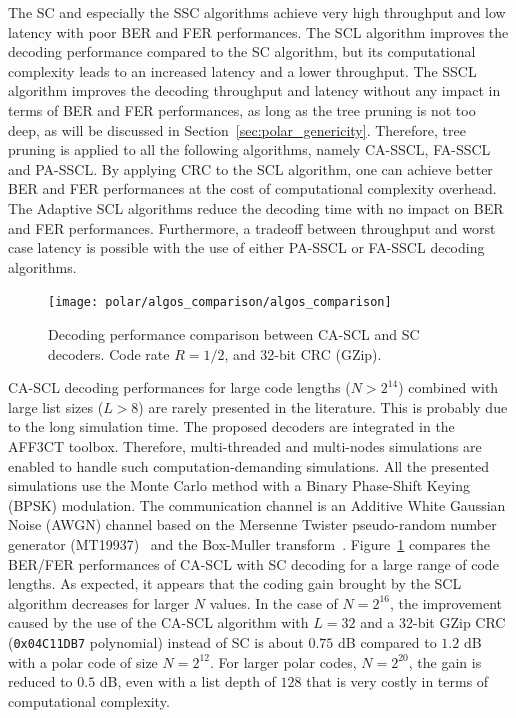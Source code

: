 The SC and especially the SSC algorithms achieve very high throughput and low
latency with poor BER and FER performances. The SCL algorithm improves the
decoding performance compared to the SC algorithm, but its computational
complexity leads to an increased latency and a lower throughput. The SSCL
algorithm improves the decoding throughput and latency without any impact in
terms of BER and FER performances, as long as the tree pruning is not too deep,
as will be discussed in Section~\ref{sec:polar_genericity}. Therefore, tree
pruning is applied to all the following algorithms, namely CA-SSCL, FA-SSCL and
PA-SSCL. By applying CRC to the SCL algorithm, one can achieve better BER and
FER performances at the cost of computational complexity overhead. The Adaptive
SCL algorithms reduce the decoding time with no impact on BER and FER
performances. Furthermore, a tradeoff between throughput and worst case latency
is possible with the use of either PA-SSCL or FA-SSCL decoding algorithms.

\begin{figure}
  \centering
  \texttt{[image: polar/algos\_comparison/algos\_comparison]}
  \caption{Decoding performance comparison between CA-SCL and SC decoders.
    Code rate $R = 1/2$, and 32-bit CRC (GZip).}
  \label{plot:polar_algos_comparison}
\end{figure}

CA-SCL decoding performances for large code lengths ($N > 2^{14}$) combined with
large list sizes ($L > 8$) are rarely presented in the literature. This is
probably due to the long simulation time. The proposed decoders are integrated
in the AFF3CT toolbox. Therefore, multi-threaded and multi-nodes simulations
are enabled to handle such computation-demanding simulations. All the presented
simulations use the Monte Carlo method with a Binary Phase-Shift Keying (BPSK)
modulation. The communication channel is an Additive White Gaussian Noise (AWGN)
channel based on the Mersenne Twister pseudo-random number generator
(MT19937)~\cite{Matsumoto1998} and the Box-Muller transform~\cite{Box1958}.
Figure~\ref{plot:polar_algos_comparison} compares the BER/FER performances of
CA-SCL with SC decoding for a large range of code lengths. As expected, it
appears that the coding gain brought by the SCL algorithm decreases for larger
$N$ values. In the case of $N=2^{16}$, the improvement caused by the use of the
CA-SCL algorithm with $L=32$ and a 32-bit GZip CRC (\texttt{0x04C11DB7}
polynomial) instead of SC is about $0.75$ dB compared to $1.2$ dB with a polar
code of size $N=2^{12}$. For larger polar codes, $N=2^{20}$, the gain is reduced
to $0.5$ dB, even with a list depth of $128$ that is very costly in terms of
computational complexity.

